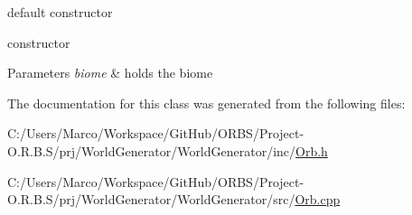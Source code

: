 default constructor 

constructor


\begin{DoxyParams}{Parameters}
{\em biome} & holds the biome \\
\hline
\end{DoxyParams}


The documentation for this class was generated from the following files\-:\begin{DoxyCompactItemize}
\item 
C\-:/\-Users/\-Marco/\-Workspace/\-Git\-Hub/\-O\-R\-B\-S/\-Project-\/\-O.\-R.\-B.\-S/prj/\-World\-Generator/\-World\-Generator/inc/\hyperlink{_orb_8h}{Orb.\-h}\item 
C\-:/\-Users/\-Marco/\-Workspace/\-Git\-Hub/\-O\-R\-B\-S/\-Project-\/\-O.\-R.\-B.\-S/prj/\-World\-Generator/\-World\-Generator/src/\hyperlink{_orb_8cpp}{Orb.\-cpp}\end{DoxyCompactItemize}
